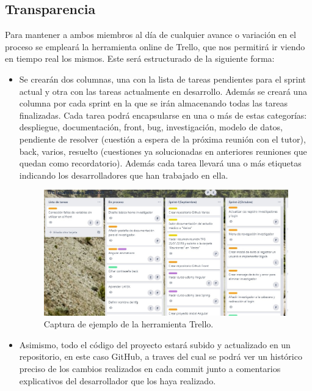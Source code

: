     \subsection{Transparencia}
    Para mantener a ambos miembros al día de cualquier avance o variación en el proceso se empleará la herramienta online de Trello, que nos permitirá ir viendo en tiempo real los mismos. Este será estructurado de la siguiente forma:
    
    \begin{itemize}
    \item Se crearán dos columnas, una con la lista de tareas pendientes para el sprint actual y otra con las tareas actualmente en desarrollo. Además se creará una columna por cada sprint en la que se irán almacenando todas las tareas finalizadas. Cada tarea podrá encapsularse en una o más de estas categorías: despliegue, documentación, front, bug, investigación, modelo de datos, pendiente de resolver (cuestión a espera de la próxima reunión con el tutor), back, varios, resuelto (cuestiones ya solucionadas en anteriores reuniones que quedan como recordatorio). Además cada tarea llevará una o más etiquetas indicando los desarrolladores que han trabajado en ella.\newline
    
     \begin{figure}[h]
    \centering
     \includegraphics[width=1\textwidth]{images/Trello.jpg}
    \caption{Captura de ejemplo de la herramienta Trello.}
    \end{figure}
    \newpage
    
    \item  Asimismo, todo el código del proyecto estará subido y actualizado en un repositorio, en este caso GitHub\cite{github}, a traves del cual se podrá ver un histórico preciso de los cambios realizados en cada commit junto a comentarios explicativos del desarrollador que los haya realizado.\newline
    

\end{itemize}
